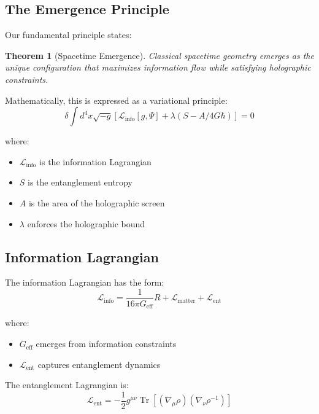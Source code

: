 \documentclass[12pt]{article}
\newtheorem{theorem}{Theorem}[section]
\DeclareMathOperator{\tr}{Tr}
\begin{document}
\subsection{The Emergence Principle}

Our fundamental principle states:

\begin{theorem}[Spacetime Emergence]
Classical spacetime geometry emerges as the unique configuration that maximizes information flow while satisfying holographic constraints.
\end{theorem}

Mathematically, this is expressed as a variational principle:
\begin{equation}
\delta \int d^4x \sqrt{-g} \left[\mathcal{L}_{\text{info}}[g, \Psi] + \lambda(S - A/4G\hbar)\right] = 0
\end{equation}

where:
\begin{itemize}
\item $\mathcal{L}_{\text{info}}$ is the information Lagrangian
\item $S$ is the entanglement entropy
\item $A$ is the area of the holographic screen
\item $\lambda$ enforces the holographic bound
\end{itemize}

\subsection{Information Lagrangian}

The information Lagrangian has the form:
\begin{equation}
\mathcal{L}_{\text{info}} = \frac{1}{16\pi G_{\text{eff}}} R + \mathcal{L}_{\text{matter}} + \mathcal{L}_{\text{ent}}
\end{equation}

where:
\begin{itemize}
\item $G_{\text{eff}}$ emerges from information constraints
\item $\mathcal{L}_{\text{ent}}$ captures entanglement dynamics
\end{itemize}

The entanglement Lagrangian is:
\begin{equation}
\mathcal{L}_{\text{ent}} = -\frac{1}{2} g^{\mu\nu} \tr[(\nabla_\mu \rho)(\nabla_\nu \rho^{-1})]
\end{equation}
\end{document}
